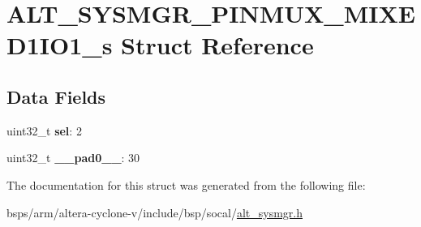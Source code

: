 \hypertarget{structALT__SYSMGR__PINMUX__MIXED1IO1__s}{}\section{A\+L\+T\+\_\+\+S\+Y\+S\+M\+G\+R\+\_\+\+P\+I\+N\+M\+U\+X\+\_\+\+M\+I\+X\+E\+D1\+I\+O1\+\_\+s Struct Reference}
\label{structALT__SYSMGR__PINMUX__MIXED1IO1__s}
\subsection*{Data Fields}
\begin{DoxyCompactItemize}
\item 
\mbox{\label{structALT__SYSMGR__PINMUX__MIXED1IO1__s_a47bd7b23c470e632c42c691e774e74de}} 
uint32\+\_\+t {\bfseries sel}\+: 2
\item 
\mbox{\label{structALT__SYSMGR__PINMUX__MIXED1IO1__s_a9e65ccd7da4b4a8dc708db616f5eaf60}} 
uint32\+\_\+t {\bfseries \+\_\+\+\_\+pad0\+\_\+\+\_\+}\+: 30
\end{DoxyCompactItemize}


The documentation for this struct was generated from the following file\+:\begin{DoxyCompactItemize}
\item 
bsps/arm/altera-\/cyclone-\/v/include/bsp/socal/\mbox{\hyperlink{alt__sysmgr_8h}{alt\+\_\+sysmgr.\+h}}\end{DoxyCompactItemize}
